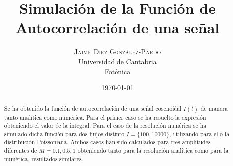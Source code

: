 \documentclass[twoside]{article}
\title{
	\vspace{-15mm}
	\fontsize{28pt}{10pt}
	\selectfont\textbf{Simulación de la Función de Autocorrelación de una señal}%
}
\author{
	\large
	\textsc{Jaime D\'iez Gonz\'alez-Pardo}\\[4mm]
	\fontsize{28pt}{10pt} Universidad de Cantabria \\ %
	\normalsize Fotónica \\ 
}
\date{ \today }
\begin{document}
	\maketitle %


	\thispagestyle{fancy} %


	\begin{abstract}

		\noindent%

			Se ha obtenido la función de autocorrelación de una señal cosenoidal $I(t)$ de manera tanto analítica como numérica. Para el primer caso se ha resuelto la expresión obteniendo el valor de la integral. Para el caso de la resolución numérica se ha simulado dicha función para dos flujos distinto $\bar{I} = \{ 100, 10000 \}$, utilizando para ello la distribución Poissoniana. Ambos casos han sido calculados para tres amplitudes diferentes de $M = {0.1, 0.5, 1}$ obteniendo tanto para la resolución analitica como para la numérica, resultados similares.

	\end{abstract}

\end{document}
